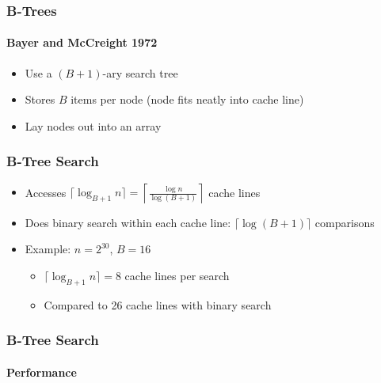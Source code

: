 \documentclass[xcolor=dvipsnames]{beamer}
\newcommand{\mi}[1]{\multiinclude[<+>][start=1,format=pdf]{#1}}
\begin{document}
\begin{frame}
   \frametitle{B-Trees}
   \framesubtitle{Bayer and McCreight 1972}

   \begin{itemize}
      \item<+->Use a $(B+1)$-ary search tree
      \item<+->Stores $B$ items per node (node fits neatly into cache line)
   \end{itemize}
   \begin{center}
   \end{center}
   \begin{itemize}
      \item<+->Lay nodes out into an array
   \end{itemize}
\end{frame}
 

\begin{frame}
   \frametitle{B-Tree Search}

   \begin{center}
      \mi{figs/btree-search}
   \end{center}
   \begin{itemize}
      \item<13->Accesses $\lceil\log_{B+1} n\rceil=\left\lceil\frac{\log n}{\log(B+1)}\right\rceil$ cache lines
      \item<14->Does binary search within each cache line: $\lceil\log(B+1)\rceil$ comparisons
      \item<15->Example: $n=2^{30}$, $B=16$
      \begin{itemize}
         \item<16->$\lceil\log_{B+1} n\rceil = 8$ cache lines per search
         \item<17->Compared to 26 cache lines with binary search
      \end{itemize}
   \end{itemize}
\end{frame}

\begin{frame}
   \frametitle{B-Tree Search}
   \framesubtitle{Performance}
\end{frame}
\end{document}
